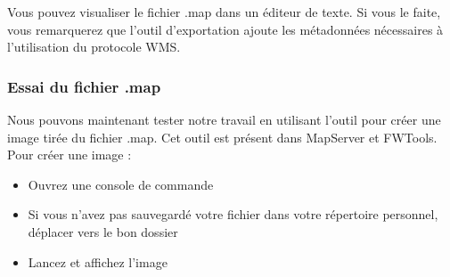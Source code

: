 
Vous pouvez visualiser le fichier .map dans un \'editeur de texte. Si vous le faite, vous remarquerez que l'outil d'exportation ajoute les m\'etadonn\'ees n\'ecessaires \`a l'utilisation du protocole WMS.

%

\subsubsection{Essai du fichier .map}

Nous pouvons maintenant tester notre travail en utilisant l'outil  pour cr\'eer une image tir\'ee du fichier .map. Cet outil est pr\'esent dans MapServer et FWTools. 
Pour cr\'eer une image :

% 

\begin{itemize}
\item Ouvrez une console de commande
\item Si vous n'avez pas sauvegard\'e votre fichier dans votre r\'epertoire personnel, d\'eplacer vers le bon dossier
\item Lancez  et affichez l'image
\end{itemize}
 
